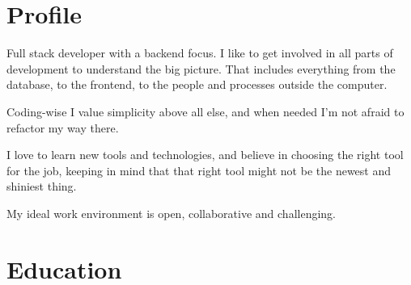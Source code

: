 \documentclass[11pt,a4paper,sans]{moderncv}        %
\begin{document}
\makecvtitle

\section{Profile}
Full stack developer with a backend focus. I like to get involved in all parts of development to understand the big picture. That includes everything from the database, to the frontend, to the people and processes outside the computer.

Coding-wise I value simplicity above all else, and when needed I’m not afraid to refactor my way there. 

I love to learn new tools and technologies, and believe in choosing the right tool for the job, keeping in mind that that right tool might not be the newest and shiniest thing.

My ideal work environment is open, collaborative and challenging.

\section{Education}
\end{document}
